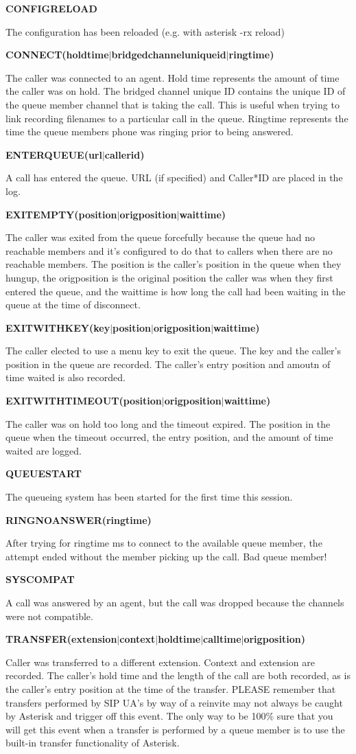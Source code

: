 \textbf{CONFIGRELOAD}

The configuration has been reloaded (e.g. with asterisk -rx reload)

\textbf{CONNECT(holdtime$|$bridgedchanneluniqueid$|$ringtime)}

The caller was connected to an agent.  Hold time represents the amount
of time the caller was on hold. The bridged channel unique ID contains
the unique ID of the queue member channel that is taking the call. This
is useful when trying to link recording filenames to a particular
call in the queue. Ringtime represents the time the queue members phone
was ringing prior to being answered.

\textbf{ENTERQUEUE(url$|$callerid)}

A call has entered the queue.  URL (if specified) and Caller*ID are placed
in the log.

\textbf{EXITEMPTY(position$|$origposition$|$waittime)}

The caller was exited from the queue forcefully because the queue had no
reachable members and it's configured to do that to callers when there
are no reachable members. The position is the caller's position in the
queue when they hungup, the origposition is the original position the
caller was when they first entered the queue, and the waittime is how
long the call had been waiting in the queue at the time of disconnect.

\textbf{EXITWITHKEY(key$|$position$|$origposition$|$waittime)}

The caller elected to use a menu key to exit the queue.  The key and
the caller's position in the queue are recorded.  The caller's entry
position and amoutn of time waited is also recorded.

\textbf{EXITWITHTIMEOUT(position$|$origposition$|$waittime)}

The caller was on hold too long and the timeout expired.  The position in the
queue when the timeout occurred, the entry position, and the amount of time
waited are logged.

\textbf{QUEUESTART}

The queueing system has been started for the first time this session.

\textbf{RINGNOANSWER(ringtime)}

After trying for ringtime ms to connect to the available queue member,
the attempt ended without the member picking up the call. Bad queue
member!

\textbf{SYSCOMPAT}

A call was answered by an agent, but the call was dropped because the
channels were not compatible.

\textbf{TRANSFER(extension$|$context$|$holdtime$|$calltime$|$origposition)}

Caller was transferred to a different extension.  Context and extension
are recorded. The caller's hold time and the length of the call are both
recorded, as is the caller's entry position at the time of the transfer.
PLEASE remember that transfers performed by SIP UA's by way of a reinvite
may not always be caught by Asterisk and trigger off this event. The only
way to be 100\% sure that you will get this event when a transfer is
performed by a queue member is to use the built-in transfer functionality
of Asterisk.
